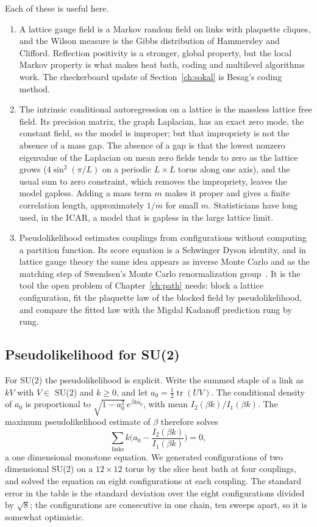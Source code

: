 Each of these is useful here.
\begin{enumerate}
\item A lattice gauge field is a Markov random field on links with plaquette cliques, and the Wilson measure is the Gibbs distribution of Hammersley and Clifford. Reflection positivity is a stronger, global property, but the local Markov property is what makes heat bath, coding and multilevel algorithms work. The checkerboard update of Section~\ref{ch:sokal} is Besag's coding method.
\item The intrinsic conditional autoregression on a lattice is the massless lattice free field. Its precision matrix, the graph Laplacian, has an exact zero mode, the constant field, so the model is improper; but that impropriety is not the absence of a mass gap. The absence of a gap is that the lowest nonzero eigenvalue of the Laplacian on mean zero fields tends to zero as the lattice grows ($4\sin^2(\pi/L)$ on a periodic $L\times L$ torus along one axis), and the usual sum to zero constraint, which removes the impropriety, leaves the model gapless. Adding a mass term $m$ makes it proper and gives a finite correlation length, approximately $1/m$ for small $m$. Statisticians have long used, in the ICAR, a model that is gapless in the large lattice limit.
\item Pseudolikelihood estimates couplings from configurations without computing a partition function. Its score equation is a Schwinger Dyson identity, and in lattice gauge theory the same idea appears as inverse Monte Carlo and as the matching step of Swendsen's Monte Carlo renormalization group~\cite{Sw79}. It is the tool the open problem of Chapter~\ref{ch:path} needs: block a lattice configuration, fit the plaquette law of the blocked field by pseudolikelihood, and compare the fitted law with the Migdal Kadanoff prediction rung by rung.
\end{enumerate}

\subsection{Pseudolikelihood for SU(2)}\label{sec:c5pl}

For SU(2) the pseudolikelihood is explicit. Write the summed staple of a link as $kV$ with $V\in$ SU(2) and $k\ge0$, and let $a_0=\frac12\operatorname{tr}(UV)$. The conditional density of $a_0$ is proportional to $\sqrt{1-a_0^2}\,e^{\beta ka_0}$, with mean $I_2(\beta k)/I_1(\beta k)$. The maximum pseudolikelihood estimate of $\beta$ therefore solves
\[
\sum_{\text{links}}k\Big(a_0-\frac{I_2(\beta k)}{I_1(\beta k)}\Big)=0,
\]
a one dimensional monotone equation. We generated configurations of two dimensional SU(2) on a $12\times12$ torus by the slice heat bath at four couplings, and solved the equation on eight configurations at each coupling. The standard error in the table is the standard deviation over the eight configurations divided by $\sqrt8$; the configurations are consecutive in one chain, ten sweeps apart, so it is somewhat optimistic.

